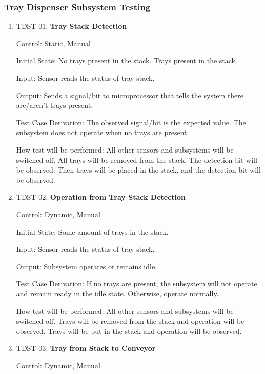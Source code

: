 \documentclass[12pt, titlepage]{article}
\begin{document}
\subsubsection{Tray Dispenser Subsystem Testing}

\begin{enumerate}
        
  \item{TDST-01: \textbf{Tray Stack Detection}}
  
  Control: Static, Manual
            
  Initial State: No trays present in the stack. Trays present in the stack.
            
  Input: Sensor reads the status of tray stack.
            
  Output: Sends a signal/bit to microprocessor that tells the system there are/aren't trays present.
   
  
  Test Case Derivation: The observed signal/bit is the expected value. The subsystem does not operate when no trays are present.
  
  How test will be performed: All other sensors and subsystems will be switched off. 
  All trays will be removed from the stack. The detection bit will be observed. 
  Then trays will be placed in the stack, and the detection bit will be observed.
\\
  \item{TDST-02: \textbf{Operation from Tray Stack Detection}}
  
  Control: Dynamic, Manual
            
  Initial State: Some amount of trays in the stack.
            
  Input: Sensor reads the status of tray stack.
            
  Output: Subsystem operates or remains idle.
  
  Test Case Derivation: If no trays are present, the subsystem will not operate 
  and remain ready in the idle state. Otherwise, operate normally.
  
  How test will be performed: All other sensors and subsystems will be switched off. 
  Trays will be removed from the stack and operation will be observed. Trays will be 
  put in the stack and operation will be observed.\\

  \item{TDST-03: \textbf{Tray from Stack to Conveyor}}
  
  Control: Dynamic, Manual
            

\end{enumerate}
\end{document}

